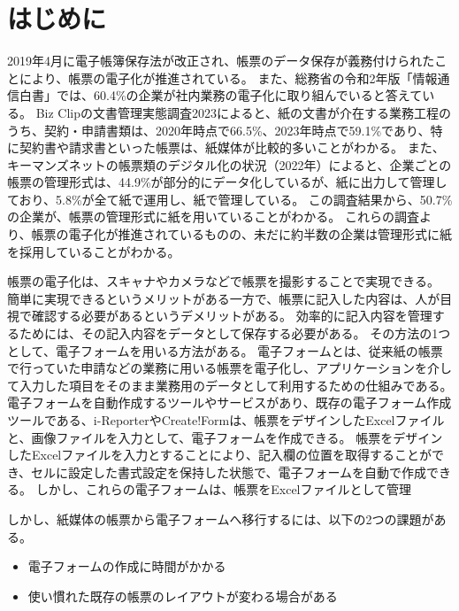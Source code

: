 \chapter{はじめに}\label{cha:Introduction}
2019年4月に電子帳簿保存法が改正され、帳票のデータ保存が義務付けられたことにより、帳票の電子化が推進されている\cite{電子帳簿保存法}。
また、総務省の令和2年版「情報通信白書」では、60.4\%の企業が社内業務の電子化に取り組んでいると答えている\cite{デジタルデータの経済的価値の計測と活用の現状に関する調査研究}。
Biz Clipの文書管理実態調査2023によると、紙の文書が介在する業務工程のうち、契約・申請書類は、2020年時点で66.5\%、2023年時点で59.1\%であり、特に契約書や請求書といった帳票は、紙媒体が比較的多いことがわかる\cite{文書管理実態調査2023}。
また、キーマンズネットの帳票類のデジタル化の状況（2022年）によると、企業ごとの帳票の管理形式は、44.9\%が部分的にデータ化しているが、紙に出力して管理しており、5.8\%が全て紙で運用し、紙で管理している\cite{帳票類のデジタル化の状況}。
この調査結果から、50.7\%の企業が、帳票の管理形式に紙を用いていることがわかる。
これらの調査より、帳票の電子化が推進されているものの、未だに約半数の企業は管理形式に紙を採用していることがわかる。

帳票の電子化は、スキャナやカメラなどで帳票を撮影することで実現できる。
簡単に実現できるというメリットがある一方で、帳票に記入した内容は、人が目視で確認する必要があるというデメリットがある。
効率的に記入内容を管理するためには、その記入内容をデータとして保存する必要がある。
その方法の1つとして、電子フォームを用いる方法がある。
電子フォームとは、従来紙の帳票で行っていた申請などの業務に用いる帳票を電子化し、アプリケーションを介して入力した項目をそのまま業務用のデータとして利用するための仕組みである\cite{電子フォーム}。
電子フォームを自動作成するツールやサービスがあり、既存の電子フォーム作成ツールである、i-Reporter\cite{i-Reporter}やCreate!Form\cite{Create!Form}は、帳票をデザインしたExcelファイルと、画像ファイルを入力として、電子フォームを作成できる。
帳票をデザインしたExcelファイルを入力とすることにより、記入欄の位置を取得することができ、セルに設定した書式設定を保持した状態で、電子フォームを自動で作成できる。
しかし、これらの電子フォームは、帳票をExcelファイルとして管理

しかし、紙媒体の帳票から電子フォームへ移行するには、以下の2つの課題がある。

\begin{itemize}
  \item 電子フォームの作成に時間がかかる
  \item 使い慣れた既存の帳票のレイアウトが変わる場合がある
\end{itemize}

